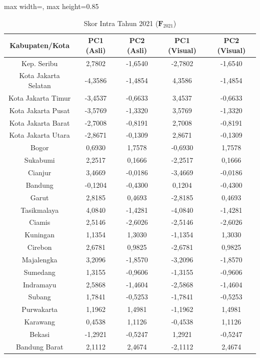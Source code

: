 \begin{table}[H]
\centering
\caption{Skor Intra Tahun 2021 ($\mathbf{F}_{2021}$)} \label{tab:app2skor_intra_2021}
\begin{adjustbox}{max width=\textwidth, max height=0.85\textheight}
\begin{tabular}{|c|c|c|c|c|}
\hline
\textbf{Kabupaten/Kota} & \textbf{PC1 (Asli)} & \textbf{PC2 (Asli)} & \textbf{PC1 (Visual)} & \textbf{PC2 (Visual)} \\
\hline
Kep. Seribu & 2,7802 & -1,6540 & -2,7802 & -1,6540 \\
Kota Jakarta Selatan & -4,3586 & -1,4854 & 4,3586 & -1,4854 \\
Kota Jakarta Timur & -3,4537 & -0,6633 & 3,4537 & -0,6633 \\
Kota Jakarta Pusat & -3,5769 & -1,3320 & 3,5769 & -1,3320 \\
Kota Jakarta Barat & -2,7008 & -0,8191 & 2,7008 & -0,8191 \\
Kota Jakarta Utara & -2,8671 & -0,1309 & 2,8671 & -0,1309 \\
Bogor & 0,6930 & 1,7578 & -0,6930 & 1,7578 \\
Sukabumi & 2,2517 & 0,1666 & -2,2517 & 0,1666 \\
Cianjur & 3,4669 & -0,0186 & -3,4669 & -0,0186 \\
Bandung & -0,1204 & -0,4300 & 0,1204 & -0,4300 \\
Garut & 2,8185 & 0,4693 & -2,8185 & 0,4693 \\
Tasikmalaya & 4,0840 & -1,4281 & -4,0840 & -1,4281 \\
Ciamis & 2,5146 & -2,6026 & -2,5146 & -2,6026 \\
Kuningan & 1,1354 & 1,3030 & -1,1354 & 1,3030 \\
Cirebon & 2,6781 & 0,9825 & -2,6781 & 0,9825 \\
Majalengka & 3,2096 & -1,8570 & -3,2096 & -1,8570 \\
Sumedang & 1,3155 & -0,9606 & -1,3155 & -0,9606 \\
Indramayu & 2,5868 & -1,4604 & -2,5868 & -1,4604 \\
Subang & 1,7841 & -0,5253 & -1,7841 & -0,5253 \\
Purwakarta & 1,1962 & 1,4981 & -1,1962 & 1,4981 \\
Karawang & 0,4538 & 1,1126 & -0,4538 & 1,1126 \\
Bekasi & -1,2921 & -0,5247 & 1,2921 & -0,5247 \\
Bandung Barat & 2,1112 & 2,4674 & -2,1112 & 2,4674 \\

\end{tabular}
\end{adjustbox}
\end{table}
